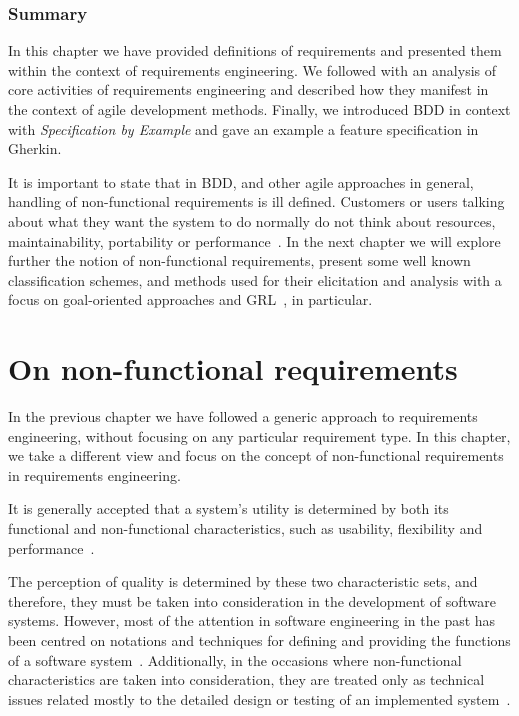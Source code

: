 \documentclass[dissertation,final]{softeng}
\newcommand{\nfrs}{non-functional requirements\xspace}
\begin{document}
\subsection{Summary}

In this chapter we have provided definitions of requirements and presented them within the context of requirements engineering. We followed with an analysis of core activities of requirements engineering and described how they manifest in the context of agile development methods. Finally, we introduced BDD in context with \emph{Specification by Example} and gave an example a feature specification in Gherkin.

It is important to state that in BDD, and other agile approaches in general, handling of non-functional requirements is ill defined. Customers or users talking about what they want the system to do normally do not think about resources, maintainability, portability or performance~\citep{Paetsch:2003tl}. In the next chapter we will explore further the notion of non-functional requirements, present some well known classification schemes, and methods used for their elicitation and analysis with a focus on goal-oriented approaches and GRL~\citep{Amyot2010}, in particular.

\chapter{On non-functional requirements}
\label{ch:nfr_research}
In the previous chapter we have followed a generic approach to requirements engineering, without focusing on any particular requirement type. In this chapter, we take a different view and focus on the concept of \nfrs in requirements engineering.

It is generally accepted that a system's utility is determined by both its functional and non-functional characteristics, such as usability, flexibility and performance~\citep{Chung:2009vg}.

The perception of quality is determined by these two characteristic sets, and therefore, they must be taken into consideration in the development of software systems. However, most of the attention in software engineering in the past has been centred on notations and techniques for defining and providing the functions of a software system~\citep{Chung:2009vg}. Additionally, in the occasions where non-functional characteristics are taken into consideration, they are treated only as technical issues related mostly to the detailed design or testing of an implemented system~\citep{Chung:2009vg}.
\end{document}
